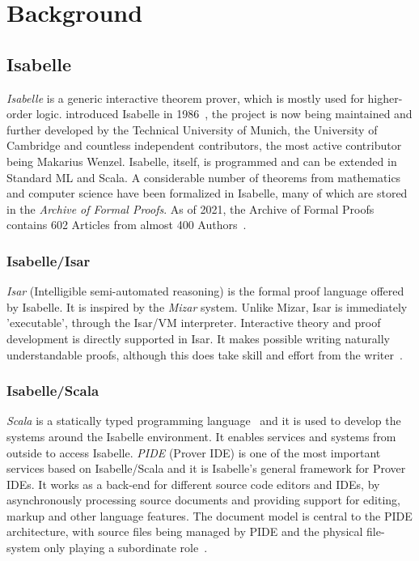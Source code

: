 
\chapter{Background}
\label{chapter:background}

\section{Isabelle}
\label{section:isabelle}
\emph{Isabelle} is a generic interactive theorem prover, which is mostly used for higher-order logic. \citeauthor{lpi} introduced Isabelle in 1986~\parencite{lpi}, the project is now being maintained and further developed by the Technical University of Munich, the University of Cambridge and countless independent contributors, the most active contributor being Makarius Wenzel. Isabelle, itself, is programmed and can be extended in Standard ML and Scala. A considerable number of theorems from mathematics and computer science have been formalized in Isabelle, many of which are stored in the \emph{Archive of Formal Proofs}. As of 2021, the Archive of Formal Proofs contains 602 Articles from almost 400 Authors~\parencite{afp}.

\subsection*{Isabelle/Isar}
\emph{Isar} (Intelligible semi-automated reasoning) is the formal proof language offered by Isabelle. It is inspired by the \emph{Mizar} system. Unlike Mizar, Isar is immediately 'executable', through the Isar/VM interpreter. Interactive theory and proof development is directly supported in Isar. It makes possible writing naturally understandable proofs, although this does take skill and effort from the writer~\parencite{isar_ref}.

\subsection*{Isabelle/Scala}
\emph{Scala} is a statically typed programming language~\parencite{scala} and it is used to develop the systems around the Isabelle environment. It enables services and systems from outside to access Isabelle. \emph{PIDE} (Prover IDE) is one of the most important services based on Isabelle/Scala and it is Isabelle's general framework for Prover IDEs. It works as a back-end for different source code editors and IDEs, by asynchronously processing source documents and providing support for editing, markup and other language features. The document model is central to the PIDE architecture, with source files being managed by PIDE and the physical file-system only playing a subordinate role~\parencite{isabelle_jedit}.

